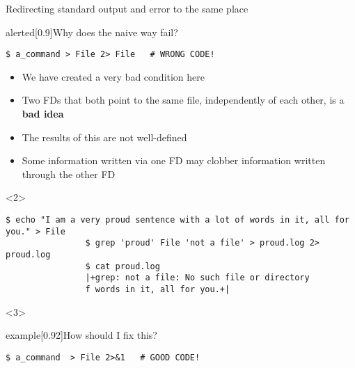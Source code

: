 \begin{frame}[fragile]{Redirecting standard output and error to the same place}
    \vspace{-4mm}
    \begin{overlayarea}{\textwidth}{0.5\textheight}
        \begin{varblock}{alerted}[0.9\textwidth]{Why does the naive way fail?}
            \begin{lstlisting}[style=MyBash, numbers=none, aboveskip=2mm, belowskip=-5mm]
                $ a_command > File 2> File   # WRONG CODE!
            \end{lstlisting}
        \end{varblock}
        \begin{itemize}[<only@1>]
            \item We have created a very bad condition here
            \item Two FDs that both point to the same file, independently of each other, is a \textbf{bad idea}
            \item The results of this are not well-defined
            \item Some information written via one FD may clobber information written through the other FD\\[-0.5em]
        \end{itemize}
        \begin{onlyenv}<2>
            \begin{lstlisting}[style=MyBash, numbers=none]
                $ echo "I am a very proud sentence with a lot of words in it, all for you." > File
                $ grep 'proud' File 'not a file' > proud.log 2> proud.log
                $ cat proud.log
                |+grep: not a file: No such file or directory
                f words in it, all for you.+|
            \end{lstlisting}
        \end{onlyenv}
        \begin{onlyenv}<3>
            \vspace{-2mm}
            \begin{varblock}{example}[0.92\textwidth]{How should I fix this?}
                \begin{lstlisting}[style=MyBash, numbers=none, aboveskip=2mm, belowskip=-5mm, xleftmargin=3mm, xrightmargin=3mm]
                    $ a_command  > File 2>&1   # GOOD CODE!

\end{lstlisting}
\end{varblock}
\end{onlyenv}
\end{overlayarea}
\end{frame}
